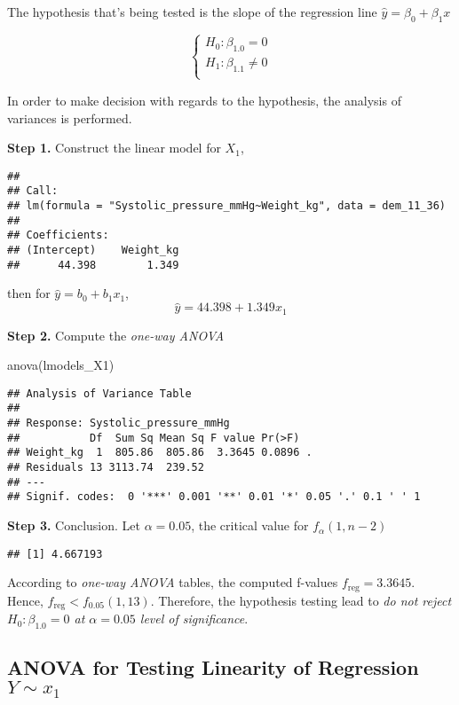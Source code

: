 \documentclass[
]{article}
\newenvironment{Shaded}{\begin{snugshade}}{\end{snugshade}}
\newcommand{\FunctionTok}[1]{\textcolor[rgb]{0.00,0.00,0.00}{#1}}
\newcommand{\NormalTok}[1]{#1}
\begin{document}
The hypothesis that's being tested is the slope of the regression line
\(\hat{y} = \beta_0 + \beta_1x\)

\[
\begin{cases}
H_0:\beta_{1.0} = 0 \\
H_1:\beta_{1.1} \neq 0 \\
\end{cases}
\]

In order to make decision with regards to the hypothesis, the analysis
of variances is performed.

\textbf{Step 1.} Construct the linear model for \(X_1\),

\begin{verbatim}
## 
## Call:
## lm(formula = "Systolic_pressure_mmHg~Weight_kg", data = dem_11_36)
## 
## Coefficients:
## (Intercept)    Weight_kg  
##      44.398        1.349
\end{verbatim}

then for \(\hat{y} = b_0 + b_1x_1\), \[
\hat{y} = 44.398 + 1.349x_1
\]

\textbf{Step 2.} Compute the \emph{one-way ANOVA}

\begin{Shaded}
\begin{Highlighting}[]
\FunctionTok{anova}\NormalTok{(lmodels\_X1)}
\end{Highlighting}
\end{Shaded}

\begin{verbatim}
## Analysis of Variance Table
## 
## Response: Systolic_pressure_mmHg
##           Df  Sum Sq Mean Sq F value Pr(>F)  
## Weight_kg  1  805.86  805.86  3.3645 0.0896 .
## Residuals 13 3113.74  239.52                 
## ---
## Signif. codes:  0 '***' 0.001 '**' 0.01 '*' 0.05 '.' 0.1 ' ' 1
\end{verbatim}

\textbf{Step 3.} Conclusion. Let \(\alpha = 0.05\), the critical value
for \(f_\alpha(1, n-2)\)

\begin{verbatim}
## [1] 4.667193
\end{verbatim}

According to \emph{one-way ANOVA} tables, the computed f-values
\(f_\text{reg} = 3.3645\). Hence, \(f_\text{reg} < f_{0.05}(1, 13)\).
Therefore, the hypothesis testing lead to \emph{do not reject
\(H_0 : \beta_{1.0} = 0\) at \(\alpha=0.05\) level of significance}.

\hypertarget{anova-for-testing-linearity-of-regression-y-sim-x_1}{%
\subsection{\texorpdfstring{ANOVA for Testing Linearity of Regression
\(Y \sim x_1\)}{ANOVA for Testing Linearity of Regression Y \textbackslash sim x\_1}}\label{anova-for-testing-linearity-of-regression-y-sim-x_1}}
\end{document}
